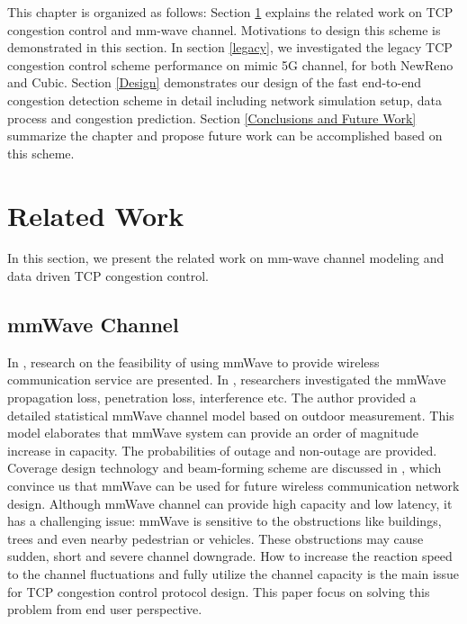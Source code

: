 \par This chapter is organized as follows: Section \ref{Related Work and Motivations} explains the related work on TCP congestion control and mm-wave channel. Motivations to design this scheme is demonstrated in this section. In section \ref{legacy}, we investigated the legacy TCP congestion control scheme performance on mimic 5G channel, for both NewReno and Cubic. Section \ref{Design} demonstrates our design of the fast end-to-end congestion detection scheme in detail including network simulation setup, data process and congestion prediction. Section \ref{Conclusions and Future Work} summarize the chapter and propose future work can be accomplished based on this scheme.

\section{Related Work}
\label{Related Work and Motivations}
In this section, we present the related work on mm-wave channel modeling and data driven TCP congestion control.  
\subsection{mmWave Channel}
\par In \cite{niu2015survey}\cite{rappaport2013millimeter}, research on the feasibility of using mmWave to provide wireless communication service are presented. In \cite{akdeniz2014millimeter}, researchers investigated the mmWave propagation loss, penetration loss, interference etc. The author provided a detailed statistical mmWave channel model based on outdoor measurement. This model elaborates that mmWave system can provide an order of magnitude increase in capacity. The probabilities of outage and non-outage are provided. Coverage design technology and beam-forming scheme are discussed in\cite{sun2014millimeter} \cite{roh2014millimeter}, which convince us that mmWave can be used for future wireless communication network design. Although mmWave channel can provide high capacity and low latency, it has a challenging issue: mmWave is sensitive to the obstructions like buildings, trees and even nearby pedestrian or vehicles. These obstructions may cause sudden, short and severe channel downgrade. How to increase the reaction speed to the channel fluctuations and fully utilize the channel capacity is the main issue for TCP congestion control protocol design. This paper focus on solving this problem from end user perspective.

